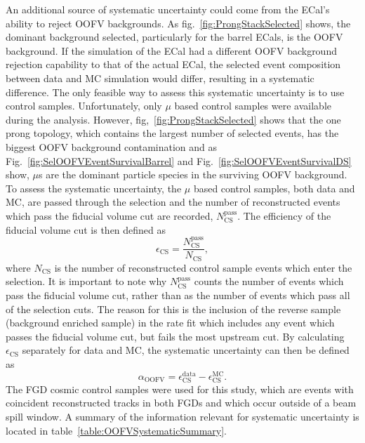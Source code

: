\newline
\newline
An additional source of systematic uncertainty could come from the ECal's ability to reject OOFV backgrounds. As fig.~\ref{fig:ProngStackSelected} shows, the dominant background selected, particularly for the barrel ECals, is the OOFV background.  If the simulation of the ECal had a different OOFV background rejection capability to that of the actual ECal, the selected event composition between data and MC simulation would differ, resulting in a systematic difference.  The only feasible way to assess this systematic uncertainty is to use control samples.  Unfortunately, only $\mu$ based control samples were available during the analysis.  However, fig,~\ref{fig:ProngStackSelected} shows that the one prong topology, which contains the largest number of selected events, has the biggest OOFV background contamination and as Fig.~\ref{fig:SelOOFVEventSurvivalBarrel} and Fig.~\ref{fig:SelOOFVEventSurvivalDS} show, $\mu$s are the dominant particle species in the surviving OOFV background.  To assess the systematic uncertainty, the $\mu$ based control samples, both data and MC, are passed through the selection and the number of reconstructed events which pass the fiducial volume cut are recorded, $N_{\textrm{CS}}^{\textrm{pass}}$.  The efficiency of the fiducial volume cut is then defined as
\begin{equation}
\epsilon_{\textrm{CS}} = \frac{N_{\textrm{CS}}^{\textrm{pass}}}{N_{\textrm{CS}}},
\label{eqn:OOFVCSEfficiency}
\end{equation}
where $N_{\textrm{CS}}$ is the number of reconstructed control sample events which enter the selection.  It is important to note why $N_{\textrm{CS}}^{\textrm{pass}}$ counts the number of events which pass the fiducial volume cut, rather than as the number of events which pass all of the selection cuts.  The reason for this is the inclusion of the reverse sample (background enriched sample) in the rate fit which includes any event which passes the fiducial volume cut, but fails the most upstream cut.  By calculating $\epsilon_{\textrm{CS}}$ separately for data and MC, the systematic uncertainty can then be defined as
\begin{equation}
\alpha_{\textrm{OOFV}} = \epsilon_{\textrm{CS}}^{\textrm{data}} - \epsilon_{\textrm{CS}}^{\textrm{MC}}.
\label{eqn:OOFVSystematic}
\end{equation}
The FGD cosmic control samples were used for this study, which are events with coincident reconstructed tracks in both FGDs and which occur outside of a beam spill window.  A summary of the information relevant for systematic uncertainty is located in table~\ref{table:OOFVSystematicSummary}.  
